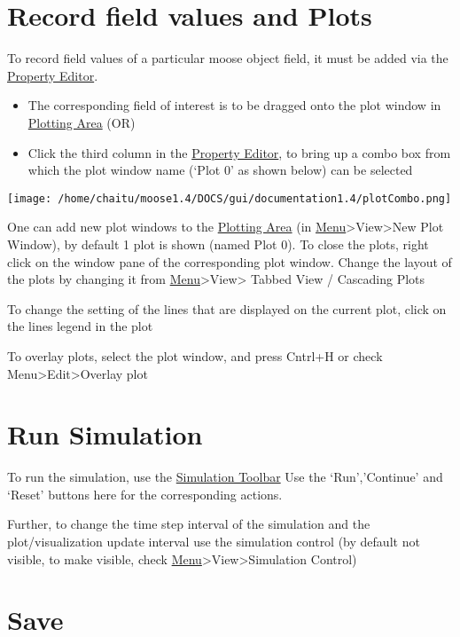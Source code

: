 \documentclass[11pt]{article}
\begin{document}
  
\section{Record field values and Plots}
\label{sec-4}

  
  To record field values of a particular moose object field, it must be added via the \hyperref[sec-2]{Property Editor}. 
\begin{itemize}
\item The corresponding field of interest is to be dragged onto the plot window in \hyperref[sec-2]{Plotting Area} (OR)
\item Click the third column in the \hyperref[sec-2]{Property Editor}, to bring up a combo box from which the plot window name (`Plot 0' as shown below) can be selected
\end{itemize}
  \texttt{[image: /home/chaitu/moose1.4/DOCS/gui/documentation1.4/plotCombo.png]}
 
  One can add new plot windows to the \hyperref[sec-1.1]{Plotting Area} (in \hyperref[sec-2]{Menu}>View>New Plot Window), by default 1 plot is shown (named Plot 0). 
  To close the plots, right click on the window pane of the corresponding plot window. 
  Change the layout of the plots by changing it from \hyperref[sec-2]{Menu}>View> Tabbed View / Cascading Plots

  To change the setting of the lines that are displayed on the current plot, click on the lines legend in the plot

  To overlay plots, select the plot window, and press Cntrl+H or check Menu>Edit>Overlay plot
  

\section{Run Simulation}
\label{sec-5}

  
  To run the simulation, use the \hyperref[sec-2]{Simulation Toolbar} Use the `Run','Continue' and `Reset' buttons here for the corresponding actions.
  
  Further, to change the time step interval of the simulation and the plot/visualization update interval use the simulation control (by default not visible, to make visible, check \hyperref[sec-2]{Menu}>View>Simulation Control)
  

\section{Save}
\label{sec-6}
\end{document}

